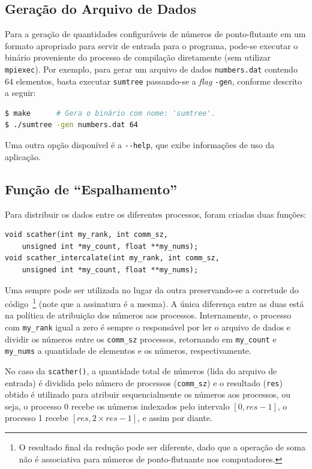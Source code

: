 \documentclass[12pt,a4paper]{article}
\begin{document}
\subsection{Geração do Arquivo de Dados}
\label{sec:data-gen}
Para a geração de quantidades configuráveis de números de ponto-flutante em um
formato apropriado para servir de entrada para o programa, pode-se executar o
binário proveniente do processo de compilação diretamente (sem utilizar
\texttt{mpiexec}). Por exemplo, para gerar um arquivo de dados
\texttt{numbers.dat} contendo 64 elementos, basta executar \texttt{sumtree}
passando-se a \textit{flag} \texttt{-gen}, conforme descrito a seguir:

\begin{lstlisting}[language=bash]
$ make      # Gera o binário com nome: 'sumtree'.
$ ./sumtree -gen numbers.dat 64
\end{lstlisting}

Uma outra opção disponível é a \texttt{-{}-help}, que exibe informações de uso da
aplicação.


\subsection{Função de ``Espalhamento''}
\label{sec:scather-function}
Para distribuir os dados entre os diferentes processos, foram criadas duas
funções:

\begin{lstlisting}[style=c, numbers=none]
void scather(int my_rank, int comm_sz,
    unsigned int *my_count, float **my_nums);
void scather_intercalate(int my_rank, int comm_sz,
    unsigned int *my_count, float **my_nums);
\end{lstlisting}

Uma sempre pode ser utilizada no lugar da outra preservando-se a corretude do
código~\footnote{O resultado final da redução pode ser diferente, dado que a
operação de soma não é associativa para números de ponto-flutuante nos
computadores.} (note que a assinatura é a mesma). A única diferença entre as
duas está na política de atribuição dos números aos processos.  Internamente, o
processo com \texttt{my\_rank} igual a zero é sempre o responsável por ler o
arquivo de dados e dividir os números entre os \texttt{comm\_sz} processos,
retornando em \texttt{my\_count} e \texttt{my\_nums} a quantidade de elementos e
os números, respectivamente.

No caso da \texttt{scather()}, a quantidade total de números (lida do arquivo de
entrada) é dividida pelo número de processos (\texttt{comm\_sz}) e o resultado
(\texttt{res}) obtido é utilizado para atribuir sequencialmente os números aos
processos, ou seja, o processo 0 recebe os números indexados pelo intervalo $[0,
res - 1]$, o processo 1 recebe $[res, 2 \times res - 1]$, e assim por diante.
\end{document}
